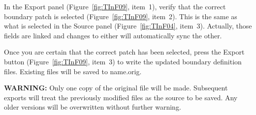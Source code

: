 \begin{description}
In the Export panel (Figure~\ref{fig:TInF09}, item~1), verify that the correct boundary patch is selected
(Figure~\ref{fig:TInF09}, item~2).
This is the same as what is selected in the Source panel (Figure~\ref{fig:TInF04}, item~3). Actually, those fields are linked and changes to either will automatically sync the other.

Once you are certain that the correct patch has been selected, press the Export button
(Figure~\ref{fig:TInF09}, item~3) to write the updated boundary definition files.  Existing files will be saved to name.orig.

\textbf{WARNING:} Only one copy of the original file will be made.  Subsequent exports will treat the previously modified files as the source to be saved.  Any older versions will be overwritten without further warning.


\end{description}


